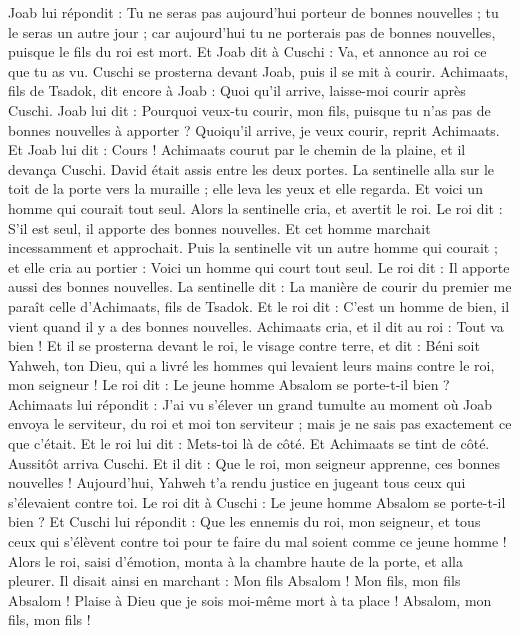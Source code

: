 \begin{multicols}{2}
Joab lui répondit : Tu ne seras pas aujourd'hui porteur de bonnes nouvelles ; tu le seras un autre jour ; car aujourd'hui tu ne porterais pas de bonnes nouvelles, puisque le fils du roi est mort.
Et Joab dit à Cuschi : Va, et annonce au roi ce que tu as vu. Cuschi se prosterna devant Joab, puis il se mit à courir.
Achimaats, fils de Tsadok, dit encore à Joab : Quoi qu'il arrive, laisse-moi courir après Cuschi. Joab lui dit : Pourquoi veux-tu courir, mon fils, puisque tu n'as pas de bonnes nouvelles à apporter ?
Quoiqu'il arrive, je veux courir, reprit Achimaats. Et Joab lui dit : Cours ! Achimaats courut par le chemin de la plaine, et il devança Cuschi.
David était assis entre les deux portes. La sentinelle alla sur le toit de la porte vers la muraille ; elle leva les yeux et elle regarda. Et voici un homme qui courait tout seul.
Alors la sentinelle cria, et avertit le roi. Le roi dit : S'il est seul, il apporte des bonnes nouvelles. Et cet homme marchait incessamment et approchait.
Puis la sentinelle vit un autre homme qui courait ; et elle cria au portier : Voici un homme qui court tout seul. Le roi dit : Il apporte aussi des bonnes nouvelles.
La sentinelle dit : La manière de courir du premier me paraît celle d'Achimaats, fils de Tsadok. Et le roi dit : C'est un homme de bien, il vient quand il y a des bonnes nouvelles.
Achimaats cria, et il dit au roi : Tout va bien ! Et il se prosterna devant le roi, le visage contre terre, et dit : Béni soit Yahweh, ton Dieu, qui a livré les hommes qui levaient leurs mains contre le roi, mon seigneur !
Le roi dit : Le jeune homme Absalom se porte-t-il bien ? Achimaats lui répondit : J'ai vu s'élever un grand tumulte au moment où Joab envoya le serviteur, du roi et moi ton serviteur ; mais je ne sais pas exactement ce que c'était.
Et le roi lui dit : Mets-toi là de côté. Et Achimaats se tint de côté.
Aussitôt arriva Cuschi. Et il dit : Que le roi, mon seigneur apprenne, ces bonnes nouvelles ! Aujourd'hui, Yahweh t'a rendu justice en jugeant tous ceux qui s'élevaient contre toi.
Le roi dit à Cuschi : Le jeune homme Absalom se porte-t-il bien ? Et Cuschi lui répondit : Que les ennemis du roi, mon seigneur, et tous ceux qui s'élèvent contre toi pour te faire du mal soient comme ce jeune homme !
Alors le roi, saisi d'émotion, monta à la chambre haute de la porte, et alla pleurer. Il disait ainsi en marchant : Mon fils Absalom ! Mon fils, mon fils Absalom ! Plaise à Dieu que je sois moi-même mort à ta place ! Absalom, mon fils, mon fils !

\end{multicols}
